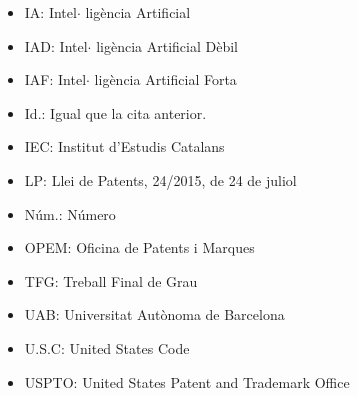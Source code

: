 \documentclass[12pt]{article}
\begin{document}
\vspace{\baselineskip}
\begin{itemize}
	\item IA: Intel$ \cdot $ ligència Artificial\par


\vspace{\baselineskip}
	\item IAD: Intel$ \cdot $ ligència Artificial Dèbil\par


\vspace{\baselineskip}
	\item IAF: Intel$ \cdot $ ligència Artificial Forta\par


\vspace{\baselineskip}
	\item Id.: Igual que la cita anterior.\par


\vspace{\baselineskip}
	\item IEC: Institut d’Estudis Catalans\par


\vspace{\baselineskip}
	\item LP: Llei de Patents, 24/2015, de 24 de juliol\par


\vspace{\baselineskip}
	\item Núm.: Número\par


\vspace{\baselineskip}
	\item OPEM: Oficina de Patents i Marques\par


\vspace{\baselineskip}
	\item TFG: Treball Final de Grau\par


\vspace{\baselineskip}
	\item UAB: Universitat Autònoma de Barcelona\par


\vspace{\baselineskip}
	\item U.S.C: United States Code\par


\vspace{\baselineskip}
	\item USPTO: United States Patent and Trademark Office
\end{itemize}\par
\end{document}
